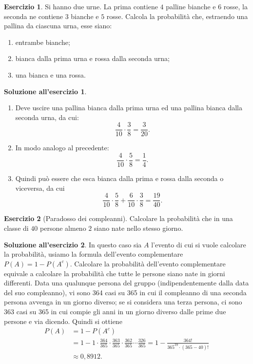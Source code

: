 \documentclass[12pt,a4paper]{article}
\theoremstyle{definition}
\newtheorem{sol}{Soluzione all'esercizio}
\newtheorem{exe}{Esercizio}
\begin{document}
\begin{exe}
	Si hanno due urne. La prima contiene $ 4 $ palline bianche e $ 6 $ rosse, la seconda ne contiene $ 3 $ bianche e $ 5 $ rosse. Calcola la probabilità che, estraendo una pallina da ciascuna urna, esse siano:
	\begin{enumerate}
		\item entrambe bianche;
		\item bianca dalla prima urna e rossa dalla seconda urna;
		\item una bianca e una rossa.
	\end{enumerate}
\end{exe}

\begin{sol}\mbox{}\vspace{-0.7cm}\\
	\begin{enumerate}
		\item Deve uscire una pallina bianca dalla prima urna ed una pallina bianca dalla seconda urna, da cui:
		      \[ \frac{4}{10}\cdot \frac{3}{8} = \frac{3}{20}. \]
		\item In modo analogo al precedente:
		      \[ \frac{4}{10}\cdot \frac{5}{8} = \frac14.\]
		\item Quindi può essere che esca bianca dalla prima e rossa dalla seconda o viceversa, da cui
		      \[ \frac{4}{10}\cdot \frac{5}{8} + \frac{6}{10}\cdot \frac{3}{8} = \frac{19}{40}.\]
	\end{enumerate}
\end{sol}

\begin{exe}[Paradosso dei compleanni]
	Calcolare la probabilità che in una classe di $ 40 $ persone almeno $ 2 $ siano nate nello stesso giorno.
\end{exe}

\begin{sol}
	In questo caso sia $ A $ l'evento di cui si vuole calcolare la probabilità, usiamo la formula dell'evento complementare $ P(A) = 1 - P(A^c) $. Calcolare la probabilità dell'evento complementare equivale a calcolare la probabilità che tutte le persone siano nate in giorni differenti. Data una qualunque persona del gruppo (indipendentemente dalla data del suo compleanno), vi sono 364 casi su 365 in cui il compleanno di una seconda persona avvenga in un giorno diverso; se si considera una terza persona, ci sono 363 casi su 365 in cui compie gli anni in un giorno diverso dalle prime due persone e via dicendo. Quindi si ottiene
	\[ \begin{split}
			P(A) & = 1 - P(A^c)                                                                                                                              \\
			     & = 1 - 1\cdot \frac{364}{365} \cdot \frac{363}{365} \cdot \frac{362}{365} \cdots \frac{326}{365} = 1- \frac{364!}{365^{39}\cdot (365-40)!} \\
			     & \approx 0,8912.
		\end{split} \]
\end{sol}
\end{document}
